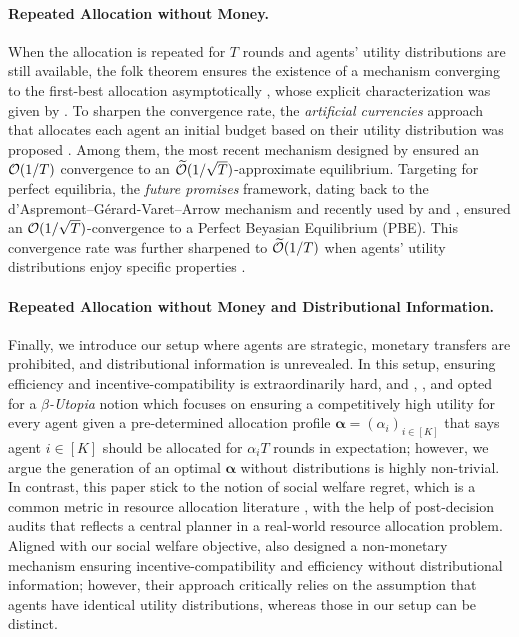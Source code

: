 \paragraph{Repeated Allocation without Money.}
When the allocation is repeated for $T$ rounds and agents' utility distributions are still available, the folk theorem ensures the existence of a mechanism converging to the first-best allocation asymptotically \citep{fudenberg2009folk}, whose explicit characterization was given by \citet{guo2009competitive}. To sharpen the convergence rate, the \textit{artificial currencies} approach that allocates each agent an initial budget based on their utility distribution was proposed \citep{friedman2006efficiency,jackson2007overcoming,kash2007optimizing,kash2015equilibrium,budish2011combinatorial,johnson2014analyzing,gorokh2021monetary}. Among them, the most recent mechanism designed by \citet{gorokh2021monetary} ensured an $\operatorname{\mathcal O}(1/T)$ convergence to an $\operatorname{\widetilde{\mathcal O}}(1/\sqrt T)$-approximate equilibrium. Targeting for perfect equilibria, the \textit{future promises} framework, dating back to the d'Aspremont--Gérard-Varet--Arrow mechanism \citep{d1979incentives,arrow1979property} and recently used by \citet{balseiro2019multiagent} and \citet{blanchard2024near}, ensured an $\operatorname{\mathcal O}(1/\sqrt T)$-convergence to a Perfect Beyasian Equilibrium (PBE). This convergence rate was further sharpened to $\operatorname{\widetilde{\mathcal O}}(1/T)$ when agents' utility distributions enjoy specific properties \citep{blanchard2024near}.

\paragraph{Repeated Allocation without Money and Distributional Information.}
Finally, we introduce our setup where agents are strategic, monetary transfers are prohibited, and distributional information is unrevealed. In this setup, ensuring efficiency and incentive-compatibility is extraordinarily hard, and \citet{gorokh2019remarkable}, \citet{banerjee2023robust}, and \citet{fikioris2023online} opted for a \textit{$\beta$-Utopia} notion which focuses on ensuring a competitively high utility for every agent given a pre-determined allocation profile $\bm \alpha=(\alpha_i)_{i\in [K]}$ that says agent $i\in [K]$ should be allocated for $\alpha_i T$ rounds in expectation; however, we argue the generation of an optimal $\bm \alpha$ without distributions is highly non-trivial. In contrast, this paper stick to the notion of social welfare regret, which is a common metric in resource allocation literature \citep{devanur2009adwords,feldman2010online,agrawal2014dynamic,devanur2019near,balseiro2023best}, with the help of post-decision audits that reflects a central planner in a real-world resource allocation problem. Aligned with our social welfare objective, \citet{yin2022online} also designed a non-monetary mechanism ensuring incentive-compatibility and efficiency without distributional information; however, their approach critically relies on the assumption that agents have identical utility distributions, whereas those in our setup can be distinct.

